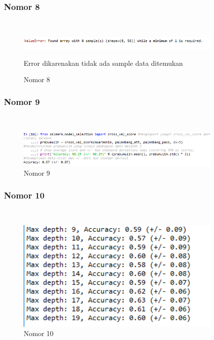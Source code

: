 \subsubsection{Nomor 8}
\hfill\\

\begin{figure}[H]
\centerline{\includegraphics[width=10cm]{figures/1174087/2/p8.png}}
\caption{Nomor 8}
Error dikarenakan tidak ada sample data ditemukan
\label{labelgambar}
\end{figure}

\subsubsection{Nomor 9}
\hfill\\

\begin{figure}[H]
\centerline{\includegraphics[width=10cm]{figures/1174087/2/p9.png}}
\caption{Nomor 9}
\label{labelgambar}
\end{figure}

\subsubsection{Nomor 10}
\hfill\\

\begin{figure}[H]
\centerline{\includegraphics[width=10cm]{figures/1174087/2/p10.png}}
\caption{Nomor 10}
\label{labelgambar}
\end{figure}

